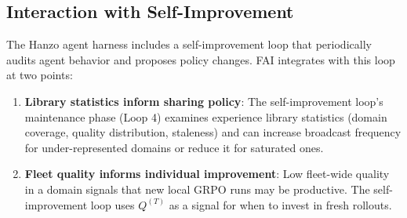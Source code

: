 \subsection{Interaction with Self-Improvement}

The Hanzo agent harness includes a self-improvement loop that periodically
audits agent behavior and proposes policy changes. FAI integrates with this
loop at two points:

\begin{enumerate}[leftmargin=1.5em]
    \item \textbf{Library statistics inform sharing policy}: The self-improvement
          loop's maintenance phase (Loop 4) examines experience library statistics
          (domain coverage, quality distribution, staleness) and can increase
          broadcast frequency for under-represented domains or reduce it for
          saturated ones.
    \item \textbf{Fleet quality informs individual improvement}: Low fleet-wide
          quality in a domain signals that new local GRPO runs may be productive.
          The self-improvement loop uses $Q^{(T)}$ as a signal for when to
          invest in fresh rollouts.
\end{enumerate}

